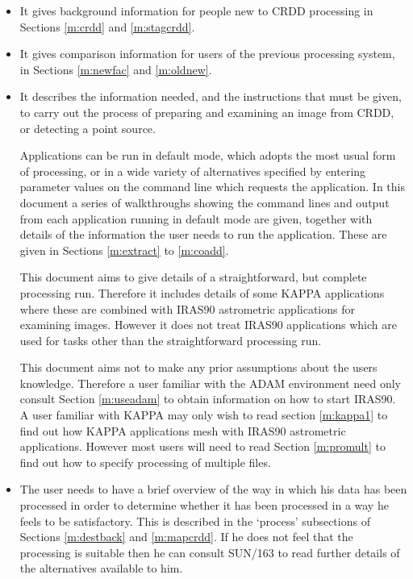 \begin{itemize}

\item It gives background information for people new to CRDD processing in
Sections \ref{m:crdd} and \ref{m:stagcrdd}.

\item It gives comparison information for users of the previous processing
system, in Sections \ref{m:newfac} and \ref{m:oldnew}.

\item It describes the information needed, and the instructions that must be
given, to carry out the process of preparing and examining an image from CRDD,
or detecting a point source.

Applications can be run in default mode, which adopts the most usual form of
processing, or in a wide variety of alternatives specified by entering parameter
values on the command line which requests the application. In this document a
series of walkthroughs showing the command lines and output from each
application running in default mode are given, together with details of the
information the user needs to run the application. These are given in
Sections \ref{m:extract} to \ref{m:coadd}.

This document aims to give details of a straightforward, but complete processing
run. Therefore it includes details of some KAPPA applications where these are
combined with IRAS90 astrometric applications for examining images. However it
does not treat IRAS90 applications which are used for tasks other than the
straightforward processing run.

This document aims not to make any prior assumptions about the users knowledge.
Therefore a user familiar with the ADAM environment need only consult Section
\ref{m:useadam} to obtain information on how to start IRAS90. A user familiar
with KAPPA may only wish to read section \ref{m:kappa1} to find out how KAPPA
applications mesh with IRAS90 astrometric applications. However most users will
need to read Section \ref{m:promult} to find out how to specify processing of
multiple files. 

\item The user needs to have a brief overview of the way in which his data has
been processed in order to determine whether it has been processed in a way he
feels to be satisfactory. This is described in the `process' subsections of
Sections \ref{m:destback} and \ref{m:mapcrdd}. If he does not feel that
the processing is suitable then he can consult SUN/163 to read further details
of the alternatives available to him.


\end{itemize}
